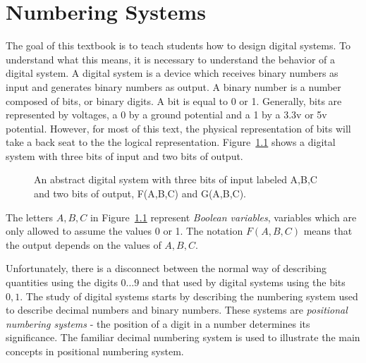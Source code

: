 \chapter{Numbering Systems}
\label{chapter:NumberingSystems}
\graphicspath{ {./chapter01/Fig} }

The goal of this textbook is to teach students how to design digital systems.
To understand what this means, it is necessary to understand the behavior of
a digital system.  A digital system is a device which receives binary
numbers as input and generates binary numbers as output.  A binary number
is a number composed of bits, or binary digits.  A bit is equal to 
0 or 1.  Generally, bits are represented by voltages, a 0 by a ground 
potential and a 1 by a 3.3v or 5v potential.  However, for most of this 
text, the physical representation of bits will take a back seat to the
the logical representation.  Figure~\ref{fig:chap01sys} shows 
a digital system with three bits of input and two bits of output.

\begin{figure}[ht]
\caption{An abstract digital system with three bits of input
labeled A,B,C and two bits of output, F(A,B,C) and G(A,B,C).}
\label{fig:chap01sys}
\end{figure}

The letters $A,B,C$ in Figure~\ref{fig:chap01sys} represent \textit{ Boolean variables}, 
 variables which are only allowed to assume the values 
0 or 1.  The notation $F(A,B,C)$ means that the output depends on the values 
of $A,B,C$. 

Unfortunately, there is a disconnect between the normal way of describing
quantities using the digits $0 \ldots 9$ and that used by digital systems
using the bits $0,1$.  The study of digital systems starts by describing
the numbering system used to describe decimal numbers and binary numbers.  
These systems are
\textit{ positional numbering systems}  
- the position of a digit in a number determines its significance.  The
familiar decimal numbering system is used to illustrate the main concepts
in positional numbering system.

